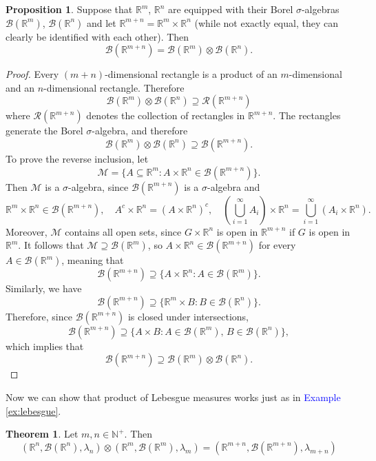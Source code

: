\documentclass[11pt,a4paper]{article}
\theoremstyle{definition}
\newtheorem{theorem}{Theorem}[section]
\newtheorem{proposition}{Proposition}[section]
\begin{document}
\begin{proposition}\label{prop:borel_R^n}
Suppose that $\mathbb{R}^m$, $\mathbb{R}^n$ are equipped with their Borel $\sigma$-algebras $\mathcal{B}(\mathbb{R}^m)$, $\mathcal{B}(\mathbb{R}^n)$ and let $\mathbb{R}^{m+n} = \mathbb{R}^{m} \times \mathbb{R}^n$ (while not exactly equal, they can clearly be identified with each other). Then
\[
\mathcal{B}(\mathbb{R}^{m+n}) = \mathcal{B}(\mathbb{R}^{m}) \otimes \mathcal{B}(\mathbb{R}^n).
\]
\end{proposition}

\begin{proof}
Every $(m+n)$-dimensional rectangle is a product of an $m$-dimensional and an $n$-dimensional rectangle. Therefore
\[
\mathcal{B}(\mathbb{R}^m) \otimes \mathcal{B}(\mathbb{R}^n) \supseteq \mathcal{R}(\mathbb{R}^{m+n})
\]
where $\mathcal{R}(\mathbb{R}^{m+n})$ denotes the collection of rectangles in $\mathbb{R}^{m+n}$. The rectangles generate the Borel $\sigma$-algebra, and therefore
\[
\mathcal{B}(\mathbb{R}^m) \otimes \mathcal{B}(\mathbb{R}^n) \supseteq \mathcal{B}(\mathbb{R}^{m+n}).
\]
To prove the reverse inclusion, let
\[
\mathcal{M} = \{A \subseteq \mathbb{R}^m : A \times \mathbb{R}^n \in \mathcal{B}(\mathbb{R}^{m+n}) \}.
\]
Then $\mathcal{M}$ is a $\sigma$-algebra, since $\mathcal{B}(\mathbb{R}^{m+n})$ is a $\sigma$-algebra and
\[
\mathbb{R}^m \times \mathbb{R}^n \in \mathcal{B}(\mathbb{R}^{m+n}), \quad 
A^c \times \mathbb{R}^n = (A \times \mathbb{R}^n)^c,
\quad
\left(\bigcup_{i=1}^\infty A_i \right) \times \mathbb{R}^n = \bigcup_{i=1}^\infty (A_i \times \mathbb{R}^n).
\]
Moreover, $\mathcal{M}$ contains all open sets, since $G \times \mathbb{R}^n$ is open in $\mathbb{R}^{m+n}$ if $G$ is open in $\mathbb{R}^m$. It follows that $\mathcal{M} \supseteq \mathcal{B}(\mathbb{R}^m)$, so $A \times \mathbb{R}^n \in \mathcal{B}(\mathbb{R}^{m+n})$ for every $A \in \mathcal{B}(\mathbb{R}^m)$, meaning that
\[
\mathcal{B}(\mathbb{R}^{m+n}) \supseteq \{A \times \mathbb{R}^n : A \in \mathcal{B}(\mathbb{R}^m) \}.
\]
Similarly, we have
\[
\mathcal{B}(\mathbb{R}^{m+n}) \supseteq \{ \mathbb{R}^m \times B : B \in \mathcal{B}(\mathbb{R}^n) \}.
\]
Therefore, since $\mathcal{B}(\mathbb{R}^{m+n})$ is closed under intersections,
\[
\mathcal{B}(\mathbb{R}^{m+n}) \supseteq \{A \times B : A \in \mathcal{B}(\mathbb{R}^m),\, B \in \mathcal{B}(\mathbb{R}^n) \},
\]
which implies that
\[
\mathcal{B}(\mathbb{R}^{m+n}) \supseteq \mathcal{B}(\mathbb{R}^m) \otimes \mathcal{B}(\mathbb{R}^n).
\]
\end{proof} \noindent
Now we can show that product of Lebesgue measures works just as in \textcolor{blue}{Example} \ref{ex:lebesgue}.
\begin{theorem}\label{thm:prod}
    Let $m,n \in \mathbb{N}^+$. Then \[
    \left(\mathbb{R}^n, \mathcal{B}(\mathbb{R}^n),\lambda_n \right) \otimes \left(\mathbb{R}^m, \mathcal{B}(\mathbb{R}^m),\lambda_m \right) = \left(\mathbb{R}^{m+n}, \mathcal{B}(\mathbb{R}^{m+n}),\lambda_{m+n} \right)
    \]
\end{theorem}
\end{document}
